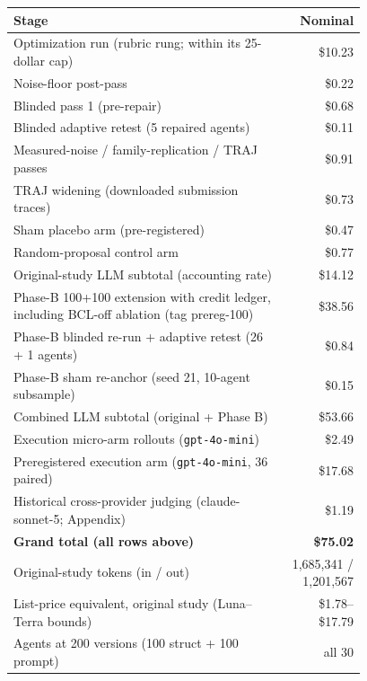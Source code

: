\begin{tabular}{@{}p{0.78\linewidth}r@{}}
\toprule
Stage & Nominal \\
\midrule
Optimization run (rubric rung; within its 25-dollar cap) & \$10.23 \\
Noise-floor post-pass & \$0.22 \\
Blinded pass 1 (pre-repair) & \$0.68 \\
Blinded adaptive retest (5 repaired agents) & \$0.11 \\
Measured-noise / family-replication / TRAJ passes & \$0.91 \\
TRAJ widening (downloaded submission traces) & \$0.73 \\
Sham placebo arm (pre-registered) & \$0.47 \\
Random-proposal control arm & \$0.77 \\
\midrule Original-study LLM subtotal (accounting rate) & \$14.12 \\
Phase-B 100+100 extension with credit ledger, including BCL-off ablation (tag prereg-100) & \$38.56 \\
Phase-B blinded re-run + adaptive retest (26 + 1 agents) & \$0.84 \\
Phase-B sham re-anchor (seed 21, 10-agent subsample) & \$0.15 \\
\midrule Combined LLM subtotal (original + Phase B) & \$53.66 \\
Execution micro-arm rollouts (\texttt{gpt-4o-mini}) & \$2.49 \\
Preregistered execution arm (\texttt{gpt-4o-mini}, 36 paired) & \$17.68 \\
Historical cross-provider judging (claude-sonnet-5; Appendix) & \$1.19 \\
\midrule \textbf{Grand total (all rows above)} & \textbf{\$75.02} \\
Original-study tokens (in / out) & 1,685,341 / 1,201,567 \\
List-price equivalent, original study (Luna--Terra bounds) & \$1.78--\$17.79 \\
Agents at 200 versions (100 struct + 100 prompt) & all 30 \\
\bottomrule
\end{tabular}
